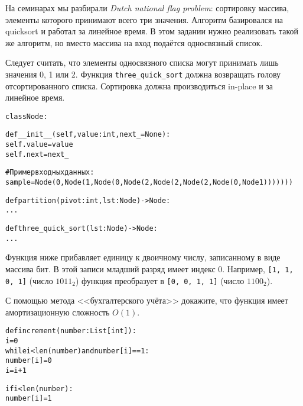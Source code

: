 \documentclass[12pt]{exam}
\begin{document}
\begin{questions}
\question[8] На семинарах мы разбирали {\em Dutch national flag problem}: сортировку массива, элементы которого принимают всего три значения. Алгоритм базировался на quicksort и работал за линейное время. В этом задании нужно реализовать такой же алгоритм, но вместо массива на вход подаётся односвязный список.

Следует считать, что элементы односвязного списка могут принимать лишь значения 0, 1 или 2. Функция {\tt three\_quick\_sort} должна возвращать голову отсортированного списка. Сортировка должна производиться in-place и за линейное время.

\newpage
\begin{alltt}
class Node:
    
    def __init__(self, value: int, next_=None):
        self.value = value
        self.next = next_


# Пример входных данных:
sample = Node(0, Node(1, Node(0, Node(2, Node(2, Node(2, Node(0, Node 1)))))))

        
def partition(pivot: int, lst: Node) -> Node:
    ...
    
def three_quick_sort(lst: Node) -> Node:
    ...
\end{alltt}

\question[6] Функция ниже прибавляет единицу к двоичному числу, записанному в виде массива бит. В этой записи младший разряд имеет индекс 0. Например, {\tt [1, 1, 0, 1]} (число $1011_2$) функция преобразует в {\tt [0, 0, 1, 1]} (число $1100_2$).

С помощью метода <<бухгалтерского учёта>> докажите, что функция имеет амортизационную сложность $O(1)$.

\begin{alltt}
def increment(number: List[int]):
    i = 0
    while i < len(number) and number[i] == 1:
        number[i] = 0
        i = i + 1
        
    if i < len(number):
        number[i] = 1
\end{alltt}



\end{questions}
\end{document}
